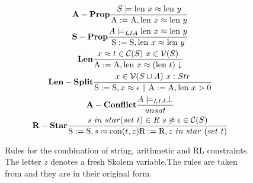 \begin{figure}
\scriptsize
\begin{minipage}{1.0\textwidth}

\begin{gather*}\label{eA1}
 \bold{A-Prop} \frac{ S \models  \textnormal{len} \ x \approx \textnormal{len} \ y}{ \textnormal{A} := \textnormal{A}, \textnormal{len} \ x \approx \textnormal{len} \ y}\\
  \bold{S-Prop} \frac{ A \models_{LIA}  \textnormal{len} \ x \approx \textnormal{len} \ y}{ \textnormal{S} := \textnormal{S}, \textnormal{len} \ x \approx \textnormal{len} \ y}\\
 \bold{Len} \frac{ x \approx t \in \mathcal{C}(S) \ x \in \mathcal{V}(S)}{ \textnormal{A} := \textnormal{A}, \textnormal{len} \ x \approx (\textnormal{len} \ t) \downarrow}\\
 \bold{Len-Split} \frac{ x \in \mathcal{V}(S \cup A) \ x: Str}{ \textnormal{S} := \textnormal{S}, x \approx \epsilon \parallel  \textnormal{A}:= \textnormal{A}, \textnormal{len} \ x > 0}\\
 \bold{A-Conflict} \frac{ A \models_{LIA} \perp }{ unsat}\\
 \bold{R-Star} \frac{ s \ in \ star( set \ t) \in R \ s  \not\approx \epsilon \in \mathcal{C}(S)}{ \textnormal{S}:= \textnormal{S}, s \approx \textnormal{con}(t,z) \textnormal{R}:= \textnormal{R}, z \ in \ star \ (set \ t)}
\end{gather*}
\null
\par\xdef\tpd{\the\prevdepth}
\end{minipage}
\caption{Rules for the combination of string, arithmetic and RL constraints. The letter $z$ denotes a fresh Skolem variable.The rules are taken from \cite{main-paper} and they are in their original form.}
\label{rules_1}
\end{figure}